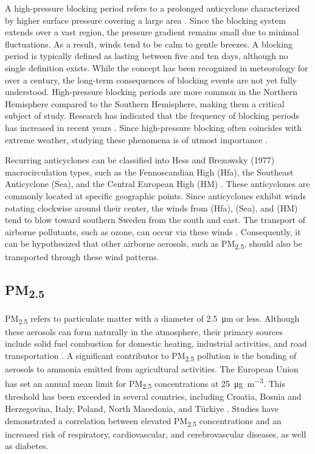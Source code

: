A high-pressure blocking period refers to a prolonged anticyclone characterized by higher surface pressure covering a large area \cite{Lupo2020}. Since the blocking system extends over a vast region, the pressure gradient remains small due to minimal fluctuations. As a result, winds tend to be calm to gentle breezes. A blocking period is typically defined as lasting between five and ten days, although no single definition exists. While the concept has been recognized in meteorology for over a century, the long-term consequences of blocking events are not yet fully understood. High-pressure blocking periods are more common in the Northern Hemisphere compared to the Southern Hemisphere, making them a critical subject of study. Research has indicated that the frequency of blocking periods has increased in recent years \cite{Lupo2020}. Since high-pressure blocking often coincides with extreme weather, studying these phenomena is of utmost importance \cite{Mitchell2006}.

Recurring anticyclones can be classified into Hess and Brezowsky (1977) macrocirculation types, such as the Fennoscandian High (Hfa), the Southeast Anticyclone (Sea), and the Central European High (HM) \cite{Bartholy2006}. These anticyclones are commonly located at specific geographic points. Since anticyclones exhibit winds rotating clockwise around their center, the winds from (Hfa), (Sea), and (HM) tend to blow toward southern Sweden from the south and east. The transport of airborne pollutants, such as ozone, can occur via these winds \cite{Otero2022}. Consequently, it can be hypothesized that other airborne aerosols, such as PM\textsubscript{2.5}, should also be transported through these wind patterns.

\subsection{PM\textsubscript{2.5}}
PM\textsubscript{2.5} refers to particulate matter with a diameter of \SI{2.5}{\micro\meter} or less. Although these aerosols can form naturally in the atmosphere, their primary sources include solid fuel combustion for domestic heating, industrial activities, and road transportation \cite{EEA2024}. A significant contributor to PM\textsubscript{2.5} pollution is the bonding of aerosols to ammonia emitted from agricultural activities. The European Union has set an annual mean limit for PM\textsubscript{2.5} concentrations at \SI{25}{\micro\gram\per\cubic\meter}. This threshold has been exceeded in several countries, including Croatia, Bosnia and Herzegovina, Italy, Poland, North Macedonia, and Türkiye \cite{EEA2024}. Studies have demonstrated a correlation between elevated PM\textsubscript{2.5} concentrations and an increased risk of respiratory, cardiovascular, and cerebrovascular diseases, as well as diabetes.

